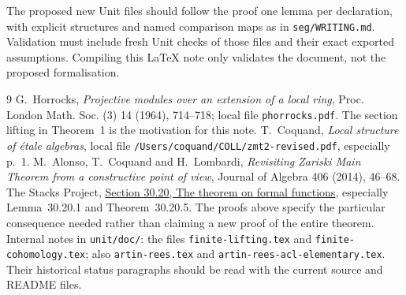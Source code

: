\documentclass[11pt]{amsart}
\theoremstyle{definition}
\theoremstyle{remark}
\newcommand{\code}[1]{\texttt{#1}}
\begin{document}
The proposed new Unit files should follow the proof one lemma per
declaration, with explicit structures and named comparison maps as
in \code{seg/WRITING.md}. Validation must include fresh Unit checks
of those files and their exact exported assumptions. Compiling this
LaTeX note only validates the document, not the proposed formalisation.

\begin{thebibliography}{9}
 G.~Horrocks, \emph{Projective modules over an
extension of a local ring}, Proc. London Math. Soc. (3) 14 (1964),
714--718; local file \code{phorrocks.pdf}. The section lifting in
Theorem~1 is the motivation for this note.
 T.~Coquand, \emph{Local structure of \'etale algebras},
local file \code{/Users/coquand/COLL/zmt2-revised.pdf}, especially p.~1.
 M.~Alonso, T.~Coquand and H.~Lombardi,
\emph{Revisiting Zariski Main Theorem from a constructive point of
view}, Journal of Algebra 406 (2014), 46--68.
 The Stacks Project,
\href{https://stacks.math.columbia.edu/tag/02O7}{Section 30.20,
The theorem on formal functions}, especially Lemma~30.20.1 and
Theorem~30.20.5. The proofs above specify the particular consequence
needed rather than claiming a new proof of the entire theorem.
 Internal notes in \code{unit/doc/}: the files
\code{finite-lifting.tex} and \code{finite-cohomology.tex}; also
\code{artin-rees.tex} and \code{artin-rees-acl-elementary.tex}.
Their historical status paragraphs should be read with the current
source and README files.
\end{thebibliography}
\end{document}
